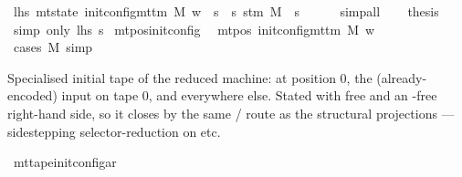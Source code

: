 \begin{isabellebody}
\ lhs{\isacharcolon}{\kern0pt}\ {\isachardoublequoteopen}mt{\isacharunderscore}{\kern0pt}state\ {\isacharparenleft}{\kern0pt}init{\isacharunderscore}{\kern0pt}config{\isacharunderscore}{\kern0pt}mttm\ M\ w{\isacharparenright}{\kern0pt}\ {\isacharequal}{\kern0pt}\ s{\isachardoublequoteclose}\ \ s{\isacharprime}{\kern0pt}{\isacharcolon}{\kern0pt}\ {\isachardoublequoteopen}s{\isacharunderscore}{\kern0pt}tm\ M\ {\isacharequal}{\kern0pt}\ s{\isachardoublequoteclose}\isanewline
\ \ \ \ \isamarkupfalse%
\ simp{\isacharunderscore}{\kern0pt}all\isanewline
\ \ \isamarkupfalse%
\ {\isacharquery}{\kern0pt}thesis\ \isamarkupfalse%
\ {\isacharparenleft}{\kern0pt}simp\ only{\isacharcolon}{\kern0pt}\ lhs\ s{\isacharprime}{\kern0pt}{\isacharparenright}{\kern0pt}\isanewline
{}\isamarkupfalse%
%
\endisatagproof
{\isafoldproof}%
%
\isadelimproof
\isanewline
%
\endisadelimproof
\isanewline
{}\isamarkupfalse%
\ mt{\isacharunderscore}{\kern0pt}pos{\isacharunderscore}{\kern0pt}init{\isacharunderscore}{\kern0pt}config{\isacharcolon}{\kern0pt}\isanewline
\ \ {\isachardoublequoteopen}mt{\isacharunderscore}{\kern0pt}pos\ {\isacharparenleft}{\kern0pt}init{\isacharunderscore}{\kern0pt}config{\isacharunderscore}{\kern0pt}mttm\ M\ w{\isacharparenright}{\kern0pt}\ {\isacharequal}{\kern0pt}\ {\isacharparenleft}{\kern0pt}{\isasymlambda}{\isacharunderscore}{\kern0pt}{\isachardot}{\kern0pt}\ {}{\isacharparenright}{\kern0pt}{\isachardoublequoteclose}\isanewline
%
\isadelimproof
\ \ %
\endisadelimproof
%
\isatagproof
{}\isamarkupfalse%
\ {\isacharparenleft}{\kern0pt}cases\ M{\isacharparenright}{\kern0pt}\ simp%
\endisatagproof
{\isafoldproof}%
%
\isadelimproof
%
\endisadelimproof
%
\begin{isamarkuptext}%
Specialised initial tape of the reduced machine:  at
  position 0, the (already-encoded) input  on tape 0, and
   everywhere else.  Stated with  free and an
  -free right-hand side, so it closes by the same
  / route as the structural
  projections — sidestepping selector-reduction on 
  etc.%
\end{isamarkuptext}\isamarkuptrue%
\isamarkupfalse%
\ mt{\isacharunderscore}{\kern0pt}tape{\isacharunderscore}{\kern0pt}init{\isacharunderscore}{\kern0pt}config{\isacharunderscore}{\kern0pt}ar{\isacharcolon}{\kern0pt}\isanewline

\end{isabellebody}
